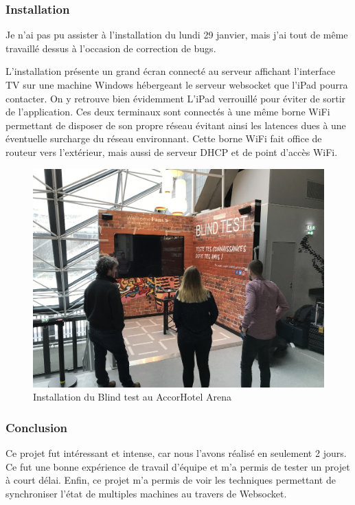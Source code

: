 \subsubsection{Installation}

Je n'ai pas pu assister à l'installation du lundi 29 janvier, mais j'ai tout de même travaillé dessus à l'occasion de correction de bugs.

L'installation présente un grand écran connecté au serveur affichant l'interface TV sur une machine Windows hébergeant le serveur websocket que l'iPad pourra contacter.
On y retrouve bien évidemment L'iPad verrouillé pour éviter de sortir de l'application.
Ces deux terminaux sont connectés à une même borne WiFi permettant de disposer de son propre réseau évitant ainsi les latences dues à une éventuelle surcharge du réseau environnant.
Cette borne WiFi fait office de routeur vers l'extérieur, mais aussi de serveur DHCP et de point d'accès WiFi.

\begin{figure}[h]
    \centering
    \includegraphics[scale=0.4]{img/accorhotel-blindtest-resize.jpg}
    \caption{Installation du Blind test au AccorHotel Arena}
\end{figure}

\subsubsection{Conclusion}

Ce projet fut intéressant et intense, car nous l'avons réalisé en seulement 2 jours.
Ce fut une bonne expérience de travail d'équipe et m'a permis de tester un projet à court délai.
Enfin, ce projet m'a permis de voir les techniques permettant de synchroniser l'état de multiples machines au travers de Websocket.
